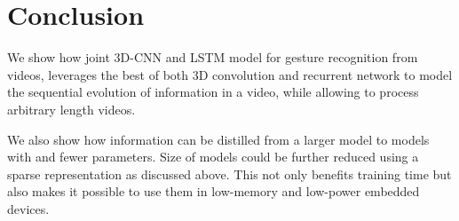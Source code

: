 \documentclass{article}
\begin{document}
\section{Conclusion}
\label{sec:conclusion}

We show how joint 3D-CNN and LSTM model for gesture recognition from videos, leverages the best of both 3D convolution and recurrent network to model the sequential evolution of information in a video, while allowing to process arbitrary length videos. 

We also show how information can be distilled from a larger model to models with  and  fewer parameters. Size of models could be further reduced using a sparse representation as discussed above. This not only benefits training time but also makes it possible to use them in low-memory and low-power embedded devices.

\newpage
\label{sec:ref}
\begin{small}
  
  
\end{small}
\end{document}
